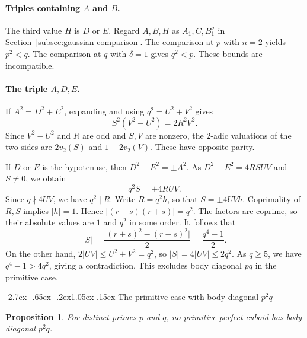 \documentclass[11pt,a4paper,twoside]{article}
\makeatletter
\numberwithin{equation}{section}
\newtheorem{proposition}[theorem]{Proposition}
\renewcommand{\section}{\@startsection{section}{1}{\z@}%
  {-2.7ex \@plus -.65ex \@minus -.2ex}{1.05ex \@plus .15ex}%
  {\normalfont\large\bfseries}}
\makeatother
\begin{document}
\paragraph{Triples containing \(A\) and \(B\).}
The third value \(H\) is \(D\) or \(E\). Regard \(A,B,H\) as \(A_1,C,B_1^\sigma\) in Section~\ref{subsec:gaussian-comparison}. The comparison at \(p\) with \(n=2\) yields \(p^2<q\). The comparison at \(q\) with \(\delta=1\) gives \(q^2<p\). These bounds are incompatible.

\paragraph{The triple \(A,D,E\).}
If \(A^2=D^2+E^2\), expanding and using \(q^2=U^2+V^2\) gives
\[
S^2(V^2-U^2)=2R^2V^2.
\]
Since \(V^2-U^2\) and \(R\) are odd and \(S,V\) are nonzero, the \(2\)-adic valuations of the two sides are \(2v_2(S)\) and \(1+2v_2(V)\). These have opposite parity.

If \(D\) or \(E\) is the hypotenuse, then \(D^2-E^2=\pm A^2\). As \(D^2-E^2=4RSUV\) and \(S\ne0\), we obtain
\[
q^2S=\pm4RUV.
\]
Since \(q\nmid4UV\), we have \(q^2\mid R\). Write \(R=q^2h\), so that \(S=\pm4UVh\). Coprimality of \(R,S\) implies \(\lvert h\rvert=1\). Hence \(\lvert(r-s)(r+s)\rvert=q^2\). The factors are coprime, so their absolute values are \(1\) and \(q^2\) in some order. It follows that
\[
\lvert S\rvert=\frac{\lvert(r+s)^2-(r-s)^2\rvert}{2}=\frac{q^4-1}{2}.
\]
On the other hand, \(2\lvert UV\rvert\le U^2+V^2=q^2\), so \(\lvert S\rvert=4\lvert UV\rvert\le2q^2\). As \(q\ge5\), we have \(q^4-1>4q^2\), giving a contradiction. This excludes body diagonal \(pq\) in the primitive case.

\section{The primitive case with body diagonal \texorpdfstring{$p^2q$}{p2q}}
\label{sec:p2q}

\begin{proposition}
\label{prop:p2q}
For distinct primes \(p\) and \(q\), no primitive perfect cuboid has
body diagonal \(p^2q\).
\end{proposition}
\end{document}
